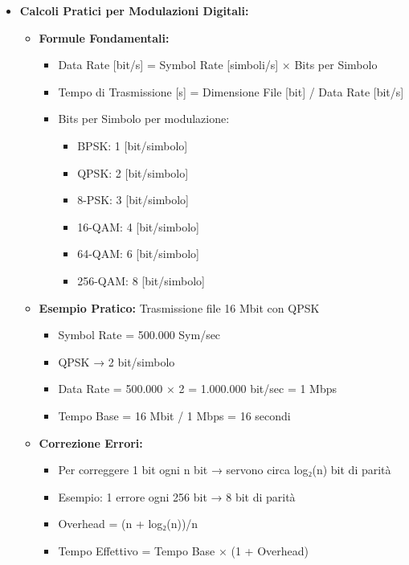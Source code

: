 \begin{itemize}
    \item \textbf{Calcoli Pratici per Modulazioni Digitali:}
    \begin{itemize}
        \item \textbf{Formule Fondamentali:}
        \begin{itemize}
            \item Data Rate [\si{bit/s}] = Symbol Rate [\si{simboli/s}] × Bits per Simbolo
            \item Tempo di Trasmissione [\si{s}] = Dimensione File [\si{bit}] / Data Rate [\si{bit/s}]
            \item Bits per Simbolo per modulazione:
                \begin{itemize}
                    \item BPSK: 1 [\si{bit/simbolo}]
                    \item QPSK: 2 [\si{bit/simbolo}]
                    \item 8-PSK: 3 [\si{bit/simbolo}]
                    \item 16-QAM: 4 [\si{bit/simbolo}]
                    \item 64-QAM: 6 [\si{bit/simbolo}]
                    \item 256-QAM: 8 [\si{bit/simbolo}]
                \end{itemize}
        \end{itemize}
        
        \item \textbf{Esempio Pratico:} Trasmissione file 16 Mbit con QPSK
        \begin{itemize}
            \item Symbol Rate = 500.000 Sym/sec
            \item QPSK → 2 bit/simbolo
            \item Data Rate = 500.000 × 2 = 1.000.000 bit/sec = 1 Mbps
            \item Tempo Base = 16 Mbit / 1 Mbps = 16 secondi
        \end{itemize}
        
        \item \textbf{Correzione Errori:}
        \begin{itemize}
            \item Per correggere 1 bit ogni n bit → servono circa log₂(n) bit di parità
            \item Esempio: 1 errore ogni 256 bit → 8 bit di parità
            \item Overhead = (n + log₂(n))/n
            \item Tempo Effettivo = Tempo Base × (1 + Overhead)
        \end{itemize}
    \end{itemize}


\end{itemize}
